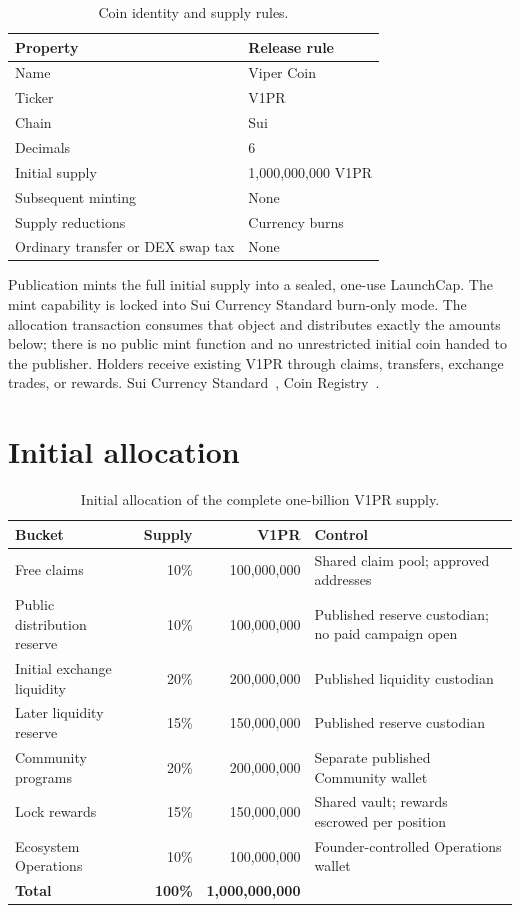\documentclass[11pt]{article}
\begin{document}
\begin{table}[H]\centering\small
\caption{Coin identity and supply rules.}
\begin{tabularx}{\textwidth}{lX}
\toprule
\textbf{Property} & \textbf{Release rule} \\
\midrule
Name & Viper Coin \\
Ticker & V1PR \\
Chain & Sui \\
Decimals & 6 \\
Initial supply & 1,000,000,000 V1PR \\
Subsequent minting & None \\
Supply reductions & Currency burns \\
Ordinary transfer or DEX swap tax & None \\
\bottomrule\end{tabularx}
\end{table}

Publication mints the full initial supply into a sealed, one-use LaunchCap. The mint capability is locked into Sui Currency Standard burn-only mode. The allocation transaction consumes that object and distributes exactly the amounts below; there is no public mint function and no unrestricted initial coin handed to the publisher. Holders receive existing V1PR through claims, transfers, exchange trades, or rewards. Sui Currency Standard~\cite{ref1}, Coin Registry~\cite{ref2}.

\section{Initial allocation}

\begin{table}[H]\centering\small
\caption{Initial allocation of the complete one-billion V1PR supply.}
\begin{tabularx}{\textwidth}{X r r X}
\toprule
\textbf{Bucket} & \textbf{Supply} & \textbf{V1PR} & \textbf{Control} \\
\midrule
Free claims & 10\% & 100,000,000 & Shared claim pool; approved addresses \\
Public distribution reserve & 10\% & 100,000,000 & Published reserve custodian; no paid campaign open \\
Initial exchange liquidity & 20\% & 200,000,000 & Published liquidity custodian \\
Later liquidity reserve & 15\% & 150,000,000 & Published reserve custodian \\
Community programs & 20\% & 200,000,000 & Separate published Community wallet \\
Lock rewards & 15\% & 150,000,000 & Shared vault; rewards escrowed per position \\
Ecosystem Operations & 10\% & 100,000,000 & Founder-controlled Operations wallet \\
\textbf{Total} & \textbf{100\%} & \textbf{1,000,000,000} &  \\
\bottomrule\end{tabularx}
\end{table}
\end{document}
